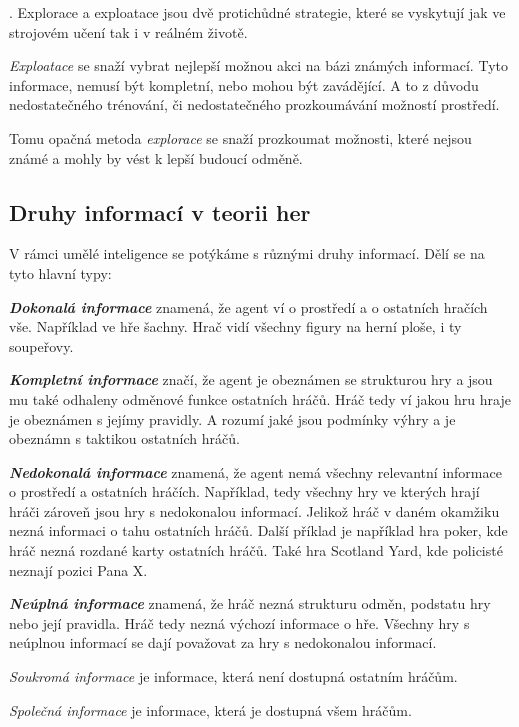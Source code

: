 \cite[Kompromis mezi potřebou získávat nové znalosti a potřebou použít již nabyté znalosti k vylepšení výkonnosti je jedním z nejzákladnějších kompromisů v přírodě]{Exploitation_Exploration}.
Explorace a exploatace jsou dvě protichůdné strategie, které se vyskytují jak ve strojovém učení tak i v reálném životě.

\emph{Exploatace} se snaží vybrat nejlepší možnou akci na bázi známých informací.
Tyto informace, nemusí být kompletní, nebo mohou být zavádějící.
A to z důvodu nedostatečného trénování, či nedostatečného prozkoumávání možností prostředí.

Tomu opačná metoda \emph{explorace} se snaží prozkoumat možnosti, které nejsou známé a mohly by vést k lepší budoucí odměně.

\subsection{Druhy informací v teorii her}
V rámci umělé inteligence se potýkáme s různými druhy informací.
Dělí se na tyto hlavní typy:

\textbf{\emph{Dokonalá informace}} znamená, že agent ví o prostředí a o ostatních hračích vše.
Například ve hře šachny.
Hrač vidí všechny figury na herní ploše, i ty soupeřovy.

\textbf{\emph{Kompletní informace}} značí, že agent je obeznámen se strukturou hry a jsou mu také odhaleny odměnové funkce ostatních hráčů.
Hráč tedy ví jakou hru hraje je obeznámen s jejímy pravidly.
A rozumí jaké jsou podmínky výhry a je obeznámn s taktikou ostatních hráčů.

\textbf{\emph{Nedokonalá informace}} znamená, že agent nemá všechny relevantní informace o prostředí a ostatních hráčích.
Například, tedy všechny hry ve kterých hrají hráči zároveň jsou hry s nedokonalou informací.
Jelikož hráč v daném okamžiku nezná informaci o tahu ostatních hráčů.
Další příklad je například hra poker, kde hráč nezná rozdané karty ostatních hráčů.
Také hra Scotland Yard, kde policisté neznají pozici Pana X.

\textbf{\emph{Neúplná informace}} znamená, že hráč nezná strukturu odměn, podstatu hry nebo její pravidla.
Hráč tedy nezná výchozí informace o hře. Všechny hry s neúplnou informací se dají považovat za hry s nedokonalou informací.

\emph{Soukromá informace} je informace, která není dostupná ostatním hráčům.

\emph{Společná informace} je informace, která je dostupná všem hráčům.

